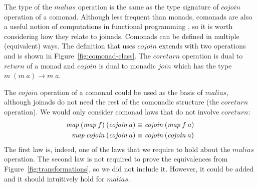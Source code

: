 \documentclass{sigplanconf}
\newcommand{\Varid}[1]{\mathit{#1}}
\begin{document}
The type of the \ensuremath{\Varid{malias}} operation is the same as the type signature of \ensuremath{\Varid{cojoin}} operation of a 
comonad. Although less frequent than monads, comonads are also a useful notion of computations in 
functional programming \cite{comomads-ypnos, comonads-dataflow}, so it is worth considering how they 
relate to joinads. Comonads can be defined in multiple (equivalent) ways. The definition that uses \ensuremath{\Varid{cojoin}} extends  with two operations and is shown in Figure~\ref{fig:comonad-class}. 
The \ensuremath{\Varid{coreturn}} operation is dual to \ensuremath{\Varid{return}} of a monad and \ensuremath{\Varid{cojoin}} is dual to monadic \ensuremath{\Varid{join}} which 
has the type \ensuremath{\Varid{m}\;(\Varid{m}\;\Varid{a})\to \Varid{m}\;\Varid{a}}.

The \ensuremath{\Varid{cojoin}} operation of a comonad could be used as the basis of \ensuremath{\Varid{malias}}, although joinads do not 
need the rest of the comonadic structure (the \ensuremath{\Varid{coreturn}} operation).
We would only consider comonad laws that do not involve \ensuremath{\Varid{coreturn}}:
\begin{align*}
\map \: (\map \: f) \: (\Varid{cojoin} \: a) &\equiv \Varid{cojoin} \: (\map \: f \: a)\\
\map \: \Varid{cojoin} \: (\Varid{cojoin} \: a) &\equiv \Varid{cojoin} \: (\Varid{cojoin} \: a)
\end{align*}
The first law is, indeed, one of the laws that we require to hold about the \ensuremath{\Varid{malias}} operation.
The second law is not required to prove the equivalences from Figure~\ref{fig:transformations},
so we did not include it. However, it could be added and it should intuitively hold for \ensuremath{\Varid{malias}}.
\end{document}
